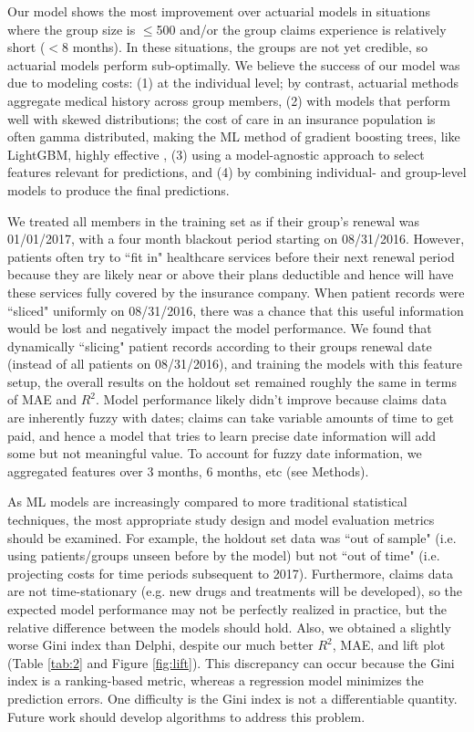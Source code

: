 \documentclass[letterpaper]{article} %
\begin{document}
Our model shows the most improvement over actuarial models in situations where the group size is $\leq$500 and/or the group claims experience is relatively short ($<$8 months).  In these situations, the groups are not yet credible, so actuarial models perform sub-optimally. We believe the success of our model was due to modeling costs: (1) at the individual level; by contrast, actuarial methods aggregate medical history across group members, (2) with models that perform well with skewed distributions; the cost of care in an insurance population is often gamma distributed, making the ML method of gradient boosting trees, like LightGBM, highly effective \cite{gradboost}, (3) using a model-agnostic approach to select features relevant for predictions, and (4) by combining individual- and group-level models to produce the final predictions.

We treated all members in the training set as if their group's renewal was 01/01/2017, with a four month blackout period starting on 08/31/2016. However, patients often try to ``fit in" healthcare services before their next renewal period because they are likely near or above their plans deductible and hence will have these services fully covered by the insurance company. When patient records were ``sliced" uniformly on 08/31/2016, there was a chance that this useful information would be lost and negatively impact the model performance. We found that dynamically ``slicing" patient records according to their groups renewal date (instead of all patients on 08/31/2016), and training the models with this feature setup, the overall results on the holdout set remained roughly the same in terms of MAE and $R^2$. Model performance likely didn't improve because claims data are inherently fuzzy with dates; claims can take variable amounts of time to get paid, and hence a model that tries to learn precise date information will add some but not meaningful value. To account for fuzzy date information, we aggregated features over 3 months, 6 months, etc (see Methods).

As ML models are increasingly compared to more traditional statistical techniques, the most appropriate study design and model evaluation metrics should be examined. For example, the holdout set data was ``out of sample" (i.e. using patients/groups unseen before by the model) but not ``out of time" (i.e. projecting costs for time periods subsequent to 2017).  Furthermore, claims data are not time-stationary (e.g. new drugs and treatments will be developed), so the expected model performance may not be perfectly realized in practice, but the relative difference between the models should hold. Also, we obtained a slightly worse Gini index than Delphi, despite our much better $R^2$, MAE, and lift plot (Table \ref{tab:2} and Figure \ref{fig:lift}).  This discrepancy can occur because the Gini index is a ranking-based metric, whereas a regression model minimizes the prediction errors. One difficulty is the Gini index is not a differentiable quantity. Future work should develop algorithms to address this problem.  
\end{document}
